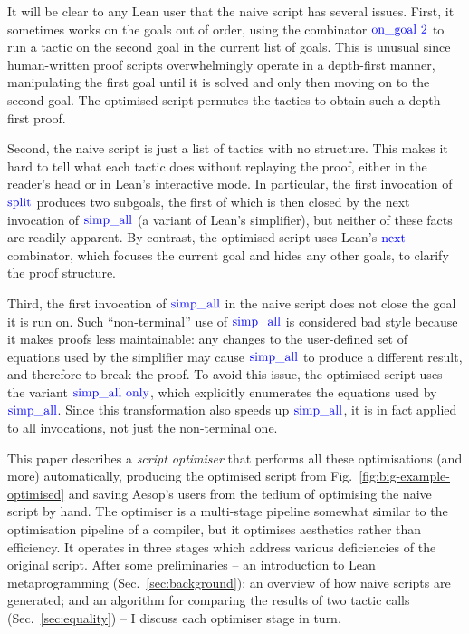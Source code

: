 \documentclass[sigplan,screen]{acmart}
\newcommand{\tac}[1]{\ensuremath{\mathrm{\mathcolor{blue}{#1}}}}
\begin{document}
It will be clear to any Lean user that the naive script has several issues.
First, it sometimes works on the goals out of order, using the combinator \tac{on\_goal~2} to run a tactic on the second goal in the current list of goals.
This is unusual since human-written proof scripts overwhelmingly operate in a depth-first manner, manipulating the first goal until it is solved and only then moving on to the second goal.
The optimised script permutes the tactics to obtain such a depth-first proof.

Second, the naive script is just a list of tactics with no structure.
This makes it hard to tell what each tactic does without replaying the proof, either in the reader's head or in Lean's interactive mode.
In particular, the first invocation of \tac{split} produces two subgoals, the first of which is then closed by the next invocation of \tac{simp\_all} (a variant of Lean's simplifier), but neither of these facts are readily apparent.
By contrast, the optimised script uses Lean's \tac{next} combinator, which focuses the current goal and hides any other goals, to clarify the proof structure.

Third, the first invocation of \tac{simp\_all} in the naive script does not close the goal it is run on.
Such \enquote{non-terminal} use of \tac{simp\_all} is considered bad style because it makes proofs less maintainable: any changes to the user-defined set of equations used by the simplifier may cause \tac{simp\_all} to produce a different result, and therefore to break the proof.
To avoid this issue, the optimised script uses the variant \tac{simp\_all~only}, which explicitly enumerates the equations used by \tac{simp\_all}.
Since this transformation also speeds up \tac{simp\_all}, it is in fact applied to all invocations, not just the non-terminal one.

This paper describes a \emph{script optimiser} that performs all these optimisations (and more) automatically, producing the optimised script from Fig.~\ref{fig:big-example-optimised} and saving Aesop's users from the tedium of optimising the naive script by hand.
The optimiser is a multi-stage pipeline somewhat similar to the optimisation pipeline of a compiler, but it optimises aesthetics rather than efficiency.
It operates in three stages which address various deficiencies of the original script.
After some preliminaries -- an introduction to Lean metaprogramming (Sec.~\ref{sec:background}); an overview of how naive scripts are generated; and an algorithm for comparing the results of two tactic calls (Sec.~\ref{sec:equality}) -- I discuss each optimiser stage in turn.
\end{document}
